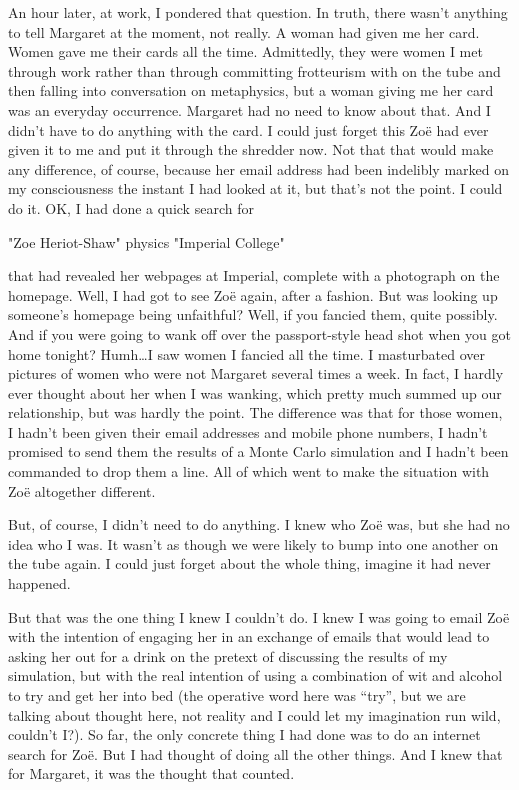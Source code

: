 An hour later, at work, I pondered that question. In truth, there
wasn't anything to tell Margaret at the moment, not really. A woman
had given me her card. Women gave me their cards all the time.
Admittedly, they were women I met through work rather than through
committing frotteurism with on the tube and then falling into
conversation on metaphysics, but a woman giving me her card was an
everyday occurrence. Margaret had no need to know about that. And I
didn't have to do anything with the card. I could just forget this
Zoë had ever given it to me and put it through the shredder now.
Not that that would make any difference, of course, because her
email address had been indelibly marked on my consciousness the
instant I had looked at it, but that's not the point. I could do it.
OK, I had done a quick search for 

\startmessage
"Zoe Heriot-Shaw" physics "Imperial College" 
\stopmessage

that had revealed her webpages at Imperial,
complete with a photograph on the homepage. Well, I had got to see
Zoë again, after a fashion. But was looking up someone's
homepage being unfaithful? Well, if you fancied them, quite
possibly. And if you were going to wank off over the passport-style
head shot when you got home tonight? Humh\dots I saw women I fancied
all the time. I masturbated over pictures of women who were not
Margaret several times a week. In fact, I hardly ever thought about
her when I was wanking, which pretty much summed up our
relationship, but was hardly the point. The difference was that for
those women, I hadn't been given their email addresses and mobile
phone numbers, I hadn't promised to send them the results of a Monte
Carlo simulation and I hadn't been commanded to drop them a line.
All of which went to make the situation with Zoë altogether
different.

But, of course, I didn't {\twelveit need\/} to do anything. I knew
who Zoë was, but she had no idea who I was. It wasn't as though
we were likely to bump into one another on the tube again. I could
just forget about the whole thing, imagine it had never happened.

But that was the one thing I knew I couldn't do. I knew I was going
to email Zoë with the intention of engaging her in an exchange
of emails that would lead to asking her out for a drink on the
pretext of discussing the results of my simulation, but with the
real intention of using a combination of wit and alcohol to try and
get her into bed (the operative word here was ``try'', but we are
talking about thought here, not reality and I could let my
imagination run wild, couldn't I?). So far, the only concrete thing
I had done was to do an internet search for Zoë. But I had {\twelveit thought\/} of
doing all the other things. And I knew that for Margaret, it was the
thought that counted.

